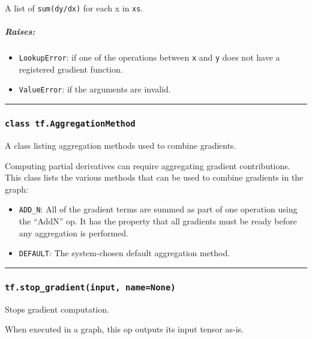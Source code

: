 A list of \texttt{sum(dy/dx)} for each x in \texttt{xs}.

\subparagraph{Raises: }\label{raises-6}

\begin{itemize}
\tightlist
\item
  \texttt{LookupError}: if one of the operations between \texttt{x} and
  \texttt{y} does not have a registered gradient function.
\item
  \texttt{ValueError}: if the arguments are invalid.
\end{itemize}

\begin{center}\rule{0.5\linewidth}{\linethickness}\end{center}

\subsubsection{\texorpdfstring{\texttt{class\ tf.AggregationMethod}
}{class tf.AggregationMethod }}\label{class-tf.aggregationmethod}

A class listing aggregation methods used to combine gradients.

Computing partial derivatives can require aggregating gradient
contributions. This class lists the various methods that can be used to
combine gradients in the graph:

\begin{itemize}
\tightlist
\item
  \texttt{ADD\_N}: All of the gradient terms are summed as part of one
  operation using the ``AddN'' op. It has the property that all
  gradients must be ready before any aggregation is performed.
\item
  \texttt{DEFAULT}: The system-chosen default aggregation method.
\end{itemize}

\begin{center}\rule{0.5\linewidth}{\linethickness}\end{center}

\subsubsection{\texorpdfstring{\texttt{tf.stop\_gradient(input,\ name=None)}
}{tf.stop\_gradient(input, name=None) }}\label{tf.stopux5fgradientinput-namenone}

Stops gradient computation.

When executed in a graph, this op outputs its input tensor as-is.

